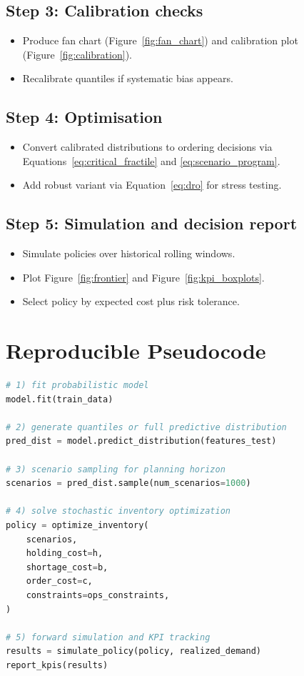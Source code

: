 \documentclass[11pt,a4paper]{article}
\begin{document}
\subsection*{Step 3: Calibration checks}
\begin{itemize}
    \item Produce fan chart (Figure~\ref{fig:fan_chart}) and calibration plot (Figure~\ref{fig:calibration}).
    \item Recalibrate quantiles if systematic bias appears.
\end{itemize}

\subsection*{Step 4: Optimisation}
\begin{itemize}
    \item Convert calibrated distributions to ordering decisions via Equations~\eqref{eq:critical_fractile} and \eqref{eq:scenario_program}.
    \item Add robust variant via Equation~\eqref{eq:dro} for stress testing.
\end{itemize}

\subsection*{Step 5: Simulation and decision report}
\begin{itemize}
    \item Simulate policies over historical rolling windows.
    \item Plot Figure~\ref{fig:frontier} and Figure~\ref{fig:kpi_boxplots}.
    \item Select policy by expected cost plus risk tolerance.
\end{itemize}

\section{Reproducible Pseudocode}

\begin{lstlisting}[language=Python]
# 1) fit probabilistic model
model.fit(train_data)

# 2) generate quantiles or full predictive distribution
pred_dist = model.predict_distribution(features_test)

# 3) scenario sampling for planning horizon
scenarios = pred_dist.sample(num_scenarios=1000)

# 4) solve stochastic inventory optimization
policy = optimize_inventory(
    scenarios,
    holding_cost=h,
    shortage_cost=b,
    order_cost=c,
    constraints=ops_constraints,
)

# 5) forward simulation and KPI tracking
results = simulate_policy(policy, realized_demand)
report_kpis(results)
\end{lstlisting}
\end{document}
